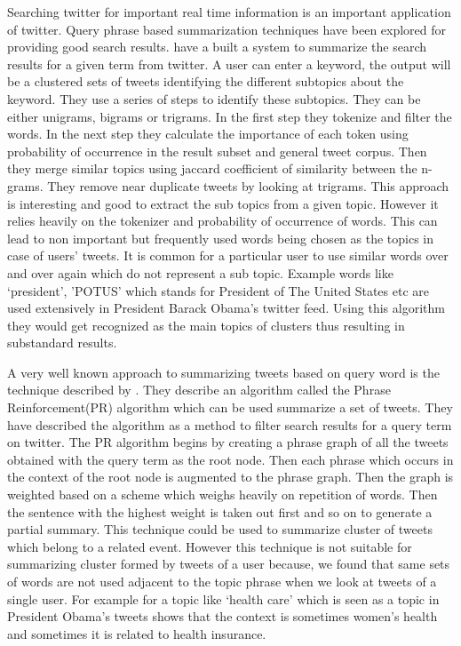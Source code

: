 Searching twitter for important real time information is an important application of twitter. Query phrase based summarization techniques have been explored for providing good search results. \citet{DBLP:conf/icwsm/OConnorKA10} have a built a system to summarize the search results for a given term from twitter. A user can enter a keyword, the output will be a clustered sets of tweets identifying the different subtopics about the keyword. They use a series of steps to identify these subtopics. They can be either unigrams, bigrams or trigrams. In the first step they tokenize and filter the words. In the next step they calculate the importance of each token using probability of occurrence in the result subset and general tweet corpus. Then they merge similar topics using jaccard coefficient of similarity between the n-grams. They remove near duplicate tweets by looking at trigrams. This approach is interesting and good to extract the sub topics from a given topic. However it relies heavily on the tokenizer and probability of occurrence of words. This can lead to non important but frequently used words being chosen as the topics in case of users' tweets. It is common for a particular user to use similar words over and over again which do not represent a sub topic. Example words like ‘president’, ’POTUS’ which stands for President of The United States etc are used extensively in President Barack Obama’s twitter feed. Using this algorithm they would get recognized as the main topics of clusters thus resulting in substandard results. 

A very well known approach to summarizing tweets based on query word is the technique described by \citet{Sharifi:2010:SMA:1857999.1858099}. They describe an algorithm called the Phrase Reinforcement(PR) algorithm which can be used summarize a set of tweets. They have described the algorithm as a method to filter search results for a query term on twitter. The PR algorithm begins by creating a phrase graph of all the tweets obtained with the query term as the root node. Then each phrase which occurs in the context of the root node is augmented to the phrase graph. Then the graph is weighted based on a scheme which weighs heavily on repetition of words. Then the sentence with the highest weight is taken out first and so on to generate a partial summary.  This technique could be used to summarize cluster of tweets which belong to a related event. However this technique is not suitable for summarizing cluster formed by tweets of a user because, we  found that same sets of words are not used adjacent to the topic phrase when we look at tweets of a single user. For example for a  topic like ‘health care’ which is seen as a topic in President Obama's tweets shows that the context is sometimes women's health and sometimes it is related to health insurance.

